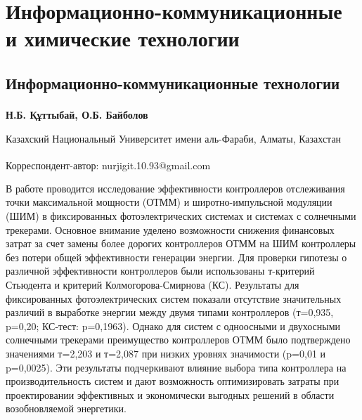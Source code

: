 \newpage
\let\cleardoublepage\clearpage
\part{Информационно-коммуникационные и химические технологии}
\chapter{Информационно-коммуникационные технологии}

\begin{articleheader}

{\bfseries
Н.Б. Құттыбай\textsuperscript{\envelope },
О.Б. Байболов
}
\end{articleheader}

\begin{affiliation}
Казахский Национальный Университет имени аль-Фараби, Алматы, Казахстан

\raggedright \textsuperscript{\envelope }Корреспондент-автор: nurjigit.10.93@gmail.com
\end{affiliation}

В работе проводится исследование эффективности контроллеров отслеживания
точки максимальной мощности (ОТММ) и широтно-импульсной модуляции (ШИМ)
в фиксированных фотоэлектрических системах и системах с солнечными
трекерами. Основное внимание уделено возможности снижения финансовых
затрат за счет замены более дорогих контроллеров ОТММ на ШИМ контроллеры
без потери общей эффективности генерации энергии. Для проверки гипотезы
о различной эффективности контроллеров были использованы т-критерий
Стьюдента и критерий Колмогорова-Смирнова (КС). Результаты для
фиксированных фотоэлектрических систем показали отсутствие значительных
различий в выработке энергии между двумя типами контроллеров (т=0,935,
p=0,20; КС-тест: p=0,1963). Однако для систем с одноосными и двухосными
солнечными трекерами преимущество контроллеров ОТММ было подтверждено
значениями т=2,203 и т=2,087 при низких уровнях значимости (p=0,01 и
p=0,0025). Эти результаты подчеркивают влияние выбора типа контроллера
на производительность систем и дают возможность оптимизировать затраты
при проектировании эффективных и экономически выгодных решений в области
возобновляемой энергетики.

